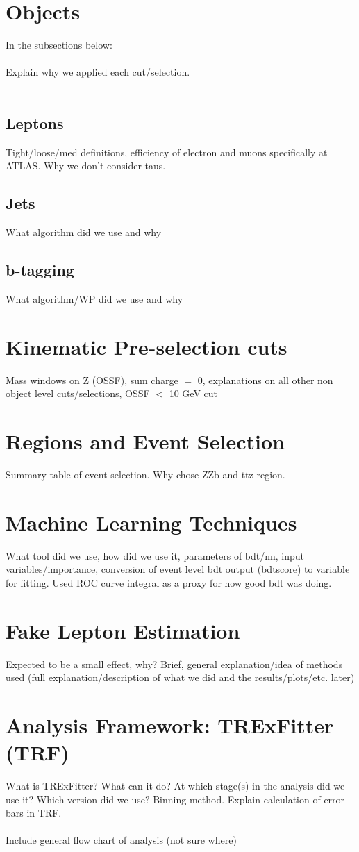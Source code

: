 \section{Objects}
In the subsections below:\\\\
Explain why we applied each cut/selection.\\\\


\subsection{Leptons}
Tight/loose/med definitions, efficiency of electron and muons specifically at ATLAS. Why we don't consider taus.
\subsection{Jets}
What algorithm did we use and why
\subsection{b-tagging}
What algorithm/WP did we use and why
\section{Kinematic Pre-selection cuts}
Mass windows on Z (OSSF), sum charge $=$ 0, explanations on all other non object level cuts/selections, OSSF $<$ 10 GeV cut
\section{Regions and Event Selection}
\label{sec:regionsAndEventSelection}

Summary table of event selection. Why chose ZZb and ttz region. 
\section{Machine Learning Techniques}
What tool did we use, how did we use it, parameters of bdt/nn, input variables/importance, conversion of event level bdt output (bdtscore) to variable for fitting. Used ROC curve integral as a proxy for how good bdt was doing. 
\section{Fake Lepton Estimation} 
Expected to be a small effect, why? Brief, general explanation/idea of methods used (full explanation/description of what we did and the results/plots/etc. later) 
\section{Analysis Framework: TRExFitter (TRF)}
What is TRExFitter? What can it do? At which stage(s) in the analysis did we use it? Which version did we use? Binning method. Explain calculation of error bars in TRF. \\\\ 
Include general flow chart of analysis (not sure where)









